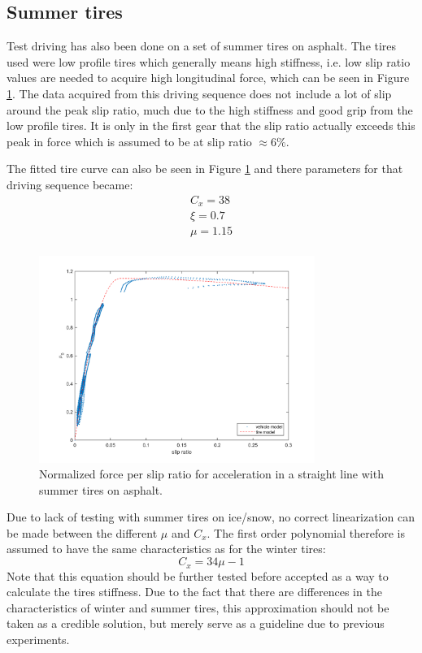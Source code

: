 \subsection{Summer tires}
\label{summer_tire}
Test driving has also been done on a set of summer tires on asphalt. The tires used were low profile tires which generally means high stiffness, i.e. low slip ratio values are needed to acquire high longitudinal force, which can be seen in Figure \ref{slip_kraft_lk_sport}. The data acquired from this driving sequence does not include a lot of slip around the peak slip ratio, much due to the high stiffness and good grip from the low profile tires. It is only in the first gear that the slip ratio actually exceeds this peak in force which is assumed to be at slip ratio $ \approx 6 \% $.

The fitted tire curve can also be seen in Figure \ref{slip_kraft_lk_sport} and there parameters for that driving sequence became:
\begin{equation}
\label{summer_lk}
\begin{split}
C_{x} = 38 \\
\xi = 0.7 \\
\mu = 1.15 \\
\end{split}
\end{equation}

\begin{figure}[h]
	\centering
	\includegraphics[width=0.8\textwidth]{Pictures/slip_kraft_lk_sport}
	\caption {Normalized force per slip ratio for acceleration in a straight line with summer tires on asphalt.}
	\label{slip_kraft_lk_sport}
\end{figure}

Due to lack of testing with summer tires on ice/snow, no correct linearization can be made between the different $ \mu $ and $ C_{x} $. The first order polynomial therefore is assumed to have the same characteristics as for the winter tires:
\begin{equation}
C_{x} = 34\mu - 1
\end{equation}
Note that this equation should be further tested before accepted as a way to calculate the tires stiffness. Due to the fact that there are differences in the characteristics of winter and summer tires, this approximation should not be taken as a credible solution, but merely serve as a guideline due to previous experiments. 

